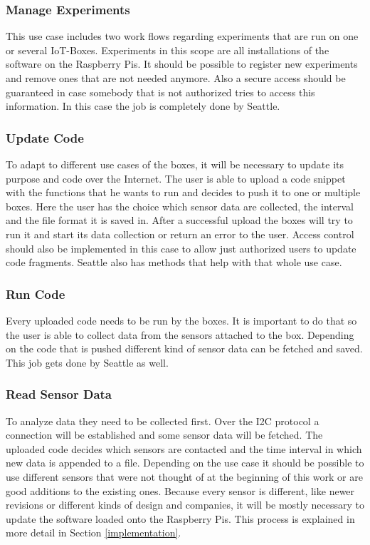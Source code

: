 \documentclass[bachelorthesis, grey, english]{mas-thesis-chapters} %
\begin{document}
\subsubsection{Manage Experiments}

This use case includes two work flows regarding experiments that are run on one or several \gls{IoT}-Boxes. Experiments in this scope are all installations of the software on the Raspberry Pis. It should be possible to register new experiments and remove ones that are not needed anymore. Also a secure access should be guaranteed in case somebody that is not authorized tries to access this information. In this case the job is completely done by Seattle.

\subsubsection{Update Code}

To adapt to different use cases of the boxes, it will be necessary to update its purpose and code over the Internet. The user is able to upload a code snippet with the functions that he wants to run and decides to push it to one or multiple boxes. Here the user has the choice which sensor data are collected, the interval and the file format it is saved in. After a successful upload the boxes will try to run it and start its data collection or return an error to the user. Access control should also be implemented in this case to allow just authorized users to update code fragments. Seattle also has methods that help with that whole use case.

\subsubsection{Run Code}

Every uploaded code needs to be run by the boxes. It is important to do that so the user is able to collect data from the sensors attached to the box. Depending on the code that is pushed different kind of sensor data can be fetched and saved. This job gets done by Seattle as well.

\subsubsection{Read Sensor Data}

To analyze data they need to be collected first. Over the \gls{I2C} protocol a connection will be established and some sensor data will be fetched. The uploaded code decides which sensors are contacted and the time interval in which new data is appended to a file. Depending on the use case it should be possible to use different sensors that were not thought of at the beginning of this work or are good additions to the existing ones. Because every sensor is different, like newer revisions or different kinds of design and companies, it will be mostly necessary to update the software loaded onto the Raspberry Pis. This process is explained in more detail in Section \ref{implementation}.
\end{document}
